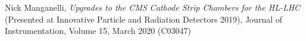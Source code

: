 
Nick Manganelli, \textit{Upgrades to the CMS Cathode Strip Chambers for the HL-LHC} (Presented at Innovative Particle and Radiation Detectors 2019), Journal of Instrumentation, Volume 15, March 2020 (C03047)
